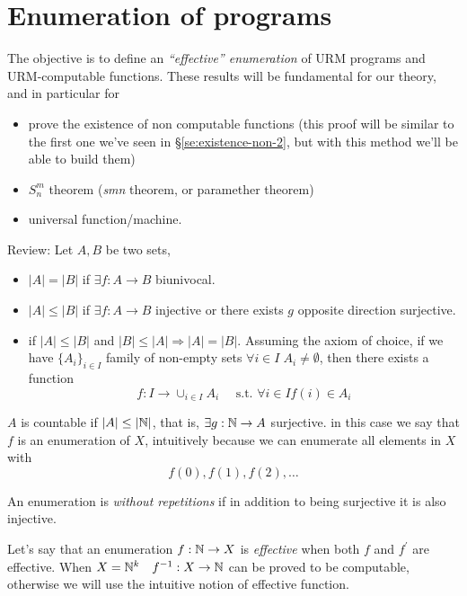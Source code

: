 \chapter{Enumeration of programs}
The objective is to define an \emph{``effective'' enumeration} of URM
programs and URM-computable functions. These results will be
fundamental for our theory, and in particular for
\begin{itemize}
\item prove the existence of non computable functions (this proof will
  be similar to the first one we've seen in
  \S\ref{se:existence-non-2}, but with this method we'll be able to
  build them)
\item $S^m_n$ theorem (\textit{smn} theorem, or paramether theorem)
  \item universal function/machine.
\end{itemize}

Review: Let $ A, B $ be two sets,
\begin{itemize}
\item $ |A| = |B| $ if $ \exists f:A\rightarrow B $ biunivocal.

\item $ |A| \leq |B| $ if $ \exists f:A\rightarrow B $ injective or
  there exists $g$ opposite direction surjective.

\item if $|A| \leq |B|$ and $|B| \leq |A| \Rightarrow |A|=|B|$.
  Assuming the axiom of choice, if we have $\{A_i\}_{i \in I}$ family
  of non-empty sets $\forall i \in I \; A_i \neq \emptyset$, then
  there exists a function $$f:I \rightarrow \cup_{i \in I}A_i \quad
  \text{ s.t. }  \forall i \in I f(i) \in A_i$$
\end{itemize}

$A$ is countable if $ |A| \leq |\mathbb{N}| $, that is,
$ \exists g: \mathbb{N} \rightarrow A $ surjective. in this case we say that
$f$ is an enumeration of $X$, intuitively because we can enumerate all
elements in $X$ with \[f(0), f(1), f(2), \dots \]

An enumeration is \emph{without repetitions} if in addition to being
surjective it is also injective.

Let's say that an enumeration $f: \mathbb{N} \rightarrow X$ is
\emph{effective} when both $f$ and $f^\prime$ are effective. When
$X = \mathbb{N}^k \quad f^{-1}: X \rightarrow \mathbb{N}$ can be proved to be
computable, otherwise we will use the intuitive notion of effective
function.


